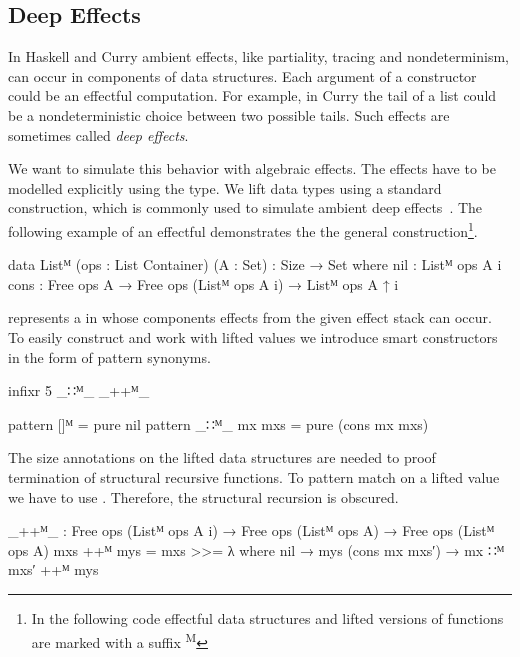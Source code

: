 \subsection{Deep Effects}

In Haskell and Curry ambient effects, like partiality, tracing and
nondeterminism, can occur in components of data structures.
Each argument of a constructor could be an effectful computation.
For example, in Curry the tail of a list could be a nondeterministic choice
between two possible tails.
Such effects are sometimes called \textit{deep effects}.

We want to simulate this behavior with algebraic effects.
The effects have to be modelled explicitly using the  type.
We lift data types using a standard construction, which is commonly used
to simulate ambient deep
effects~\cite{DBLP:conf/haskell/AbelBBHN05, DBLP:journals/programming/DylusCT19,
DBLP:conf/haskell/ChristiansenDB19}.
The following example of an effectful  demonstrates the
the general construction\footnote{In the following code effectful data
  structures and lifted versions of functions are marked with a suffix
  \textsuperscript{M}}.

\begin{code}
data Listᴹ (ops : List Container) (A : Set) : {Size} → Set where
  nil   : Listᴹ ops A {i}
  cons  : Free ops A → Free ops (Listᴹ ops A {i}) → Listᴹ ops A {↑ i}
\end{code}
\AgdaSpace{}\AgdaSpace{}
represents a \AgdaSpace{} in whose components
effects from the given effect stack  can occur.
To easily construct and work with lifted values we introduce smart constructors
in the form of pattern synonyms.

\begin{code}[hide]
infixr 5 _∷ᴹ_ _++ᴹ_
\end{code}
\begin{code}
pattern []ᴹ          = pure nil
pattern _∷ᴹ_ mx mxs  = pure (cons mx mxs)
\end{code}
The size annotations on the lifted data structures are needed to proof
termination of structural recursive functions.
To pattern match on a lifted value we have to use \AgdaFunction{>>=}.
Therefore, the structural recursion is obscured.

\begin{code}
_++ᴹ_ : Free ops (Listᴹ ops A {i}) → Free ops (Listᴹ ops A) → Free ops (Listᴹ ops A)
mxs ++ᴹ mys = mxs >>= λ where
  nil             → mys
  (cons mx mxs′)  → mx ∷ᴹ mxs′ ++ᴹ mys
\end{code}

